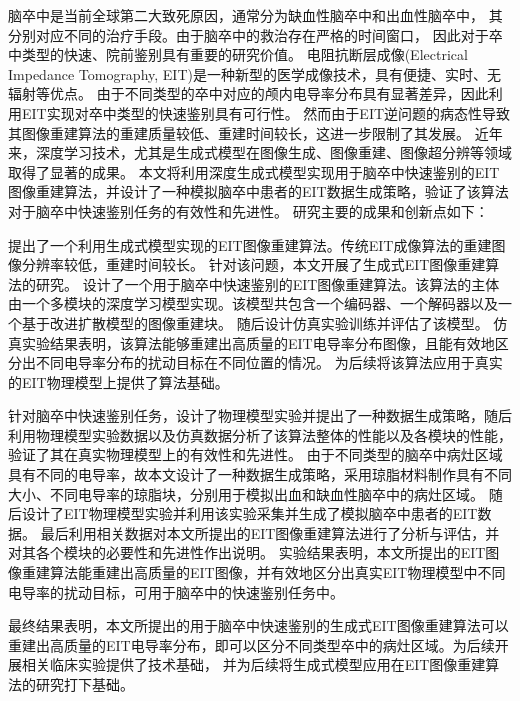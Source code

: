 
\begin{chineseabstract}

    脑卒中是当前全球第二大致死原因，通常分为缺血性脑卒中和出血性脑卒中，
    其分别对应不同的治疗手段。由于脑卒中的救治存在严格的时间窗口，
    因此对于卒中类型的快速、院前鉴别具有重要的研究价值。
    电阻抗断层成像(Electrical Impedance Tomography, EIT)是一种新型的医学成像技术，具有便捷、实时、无辐射等优点。
    由于不同类型的卒中对应的颅内电导率分布具有显著差异，因此利用EIT实现对卒中类型的快速鉴别具有可行性。
    然而由于EIT逆问题的病态性导致其图像重建算法的重建质量较低、重建时间较长，这进一步限制了其发展。
    近年来，深度学习技术，尤其是生成式模型在图像生成、图像重建、图像超分辨等领域取得了显著的成果。
    本文将利用深度生成式模型实现用于脑卒中快速鉴别的EIT图像重建算法，并设计了一种模拟脑卒中患者的EIT数据生成策略，验证了该算法对于脑卒中快速鉴别任务的有效性和先进性。
    研究主要的成果和创新点如下：

    提出了一个利用生成式模型实现的EIT图像重建算法。传统EIT成像算法的重建图像分辨率较低，重建时间较长。
    针对该问题，本文开展了生成式EIT图像重建算法的研究。
    设计了一个用于脑卒中快速鉴别的EIT图像重建算法。该算法的主体由一个多模块的深度学习模型实现。该模型共包含一个编码器、一个解码器以及一个基于改进扩散模型的图像重建块。
    随后设计仿真实验训练并评估了该模型。
    仿真实验结果表明，该算法能够重建出高质量的EIT电导率分布图像，且能有效地区分出不同电导率分布的扰动目标在不同位置的情况。
    为后续将该算法应用于真实的EIT物理模型上提供了算法基础。
    

    针对脑卒中快速鉴别任务，设计了物理模型实验并提出了一种数据生成策略，随后利用物理模型实验数据以及仿真数据分析了该算法整体的性能以及各模块的性能，验证了其在真实物理模型上的有效性和先进性。
    由于不同类型的脑卒中病灶区域具有不同的电导率，故本文设计了一种数据生成策略，采用琼脂材料制作具有不同大小、不同电导率的琼脂块，分别用于模拟出血和缺血性脑卒中的病灶区域。
    随后设计了EIT物理模型实验并利用该实验采集并生成了模拟脑卒中患者的EIT数据。
    最后利用相关数据对本文所提出的EIT图像重建算法进行了分析与评估，并对其各个模块的必要性和先进性作出说明。
    实验结果表明，本文所提出的EIT图像重建算法能重建出高质量的EIT图像，并有效地区分出真实EIT物理模型中不同电导率的扰动目标，可用于脑卒中的快速鉴别任务中。
    
    最终结果表明，本文所提出的用于脑卒中快速鉴别的生成式EIT图像重建算法可以重建出高质量的EIT电导率分布，即可以区分不同类型卒中的病灶区域。为后续开展相关临床实验提供了技术基础，
    并为后续将生成式模型应用在EIT图像重建算法的研究打下基础。






\end{chineseabstract}

